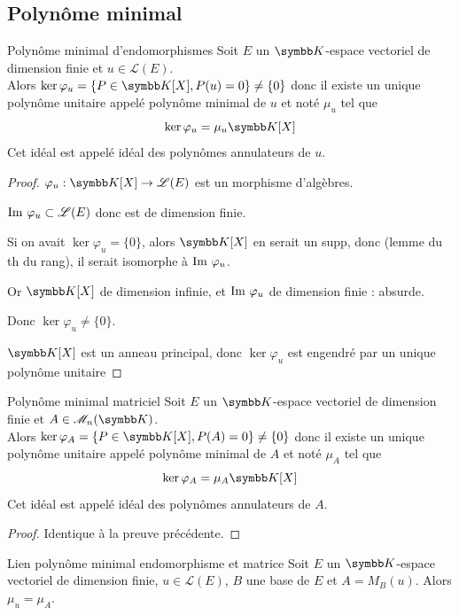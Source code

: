 \subsection{Polynôme minimal }

\begin{theoreme}{Polynôme minimal d'endomorphismes}{}
    Soit $E$ un $\K$-espace vectoriel de dimension finie et $u \in \mathscr L(E)$.\\
    Alors $\ker \varphi_u  = \{P \in \K[X], P(u) = 0\} \neq \{0\}$ donc il existe un unique 
    polynôme unitaire appelé polynôme minimal de $u$ et noté $\mu_u$ tel que 
    $$\ker \varphi_u = \mu_u \K[X]$$
    Cet idéal est appelé idéal des polynômes annulateurs de $u$.
\end{theoreme}


\begin{proof}
    $\varphi_u: \K[X] \to \mathscr L(E)$ est un morphisme d'algèbres.

    $\operatorname{Im} \, \varphi_u \subset \mathscr L(E)$ donc est de dimension finie.

    Si on avait $\ker \varphi_u = \{0\}$, alors $\K[X]$ en serait un supp, 
    donc (lemme du th du rang), il serait isomorphe à $\operatorname{Im} \, \varphi_u$.

    Or $\K[X]$ de dimension infinie, et $\operatorname{Im} \, \varphi_u$ de dimension finie : absurde. 

    Donc $\ker \varphi_u \neq \{0\}$.

    $\K[X]$ est un anneau principal, donc $\ker \varphi_u$ est engendré par un unique polynôme unitaire
\end{proof}

\begin{theoreme}{Polynôme minimal matriciel}{}
    Soit $E$ un $\K$-espace vectoriel de dimension finie et $A \in \mathscr M_n(\K)$. \\
    Alors $\ker \varphi_A = \{P \in \K[X], P(A) = 0\} \neq \{0\}$ donc il existe un unique
    polynôme unitaire appelé polynôme minimal de $A$ et noté $\mu_A$ tel que
    $$\ker \varphi_A = \mu_A \K[X]$$
    Cet idéal est appelé idéal des polynômes annulateurs de $A$.
\end{theoreme}

\begin{proof}
    Identique à la preuve précédente.
\end{proof}

\begin{theoreme}{Lien polynôme minimal endomorphisme et matrice}{}
    Soit $E$ un $\K$-espace vectoriel de dimension finie, $u \in \mathscr L(E)$, $B$ une base de $E$ et $A = M_B(u)$.
    Alors $\mu_u = \mu_A$.
\end{theoreme}

